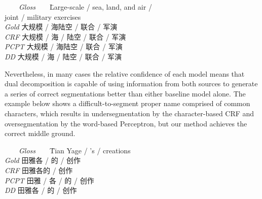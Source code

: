 \begin{small}
\begin{tabbing}
\ \ \ \ \= \emph{Gloss}\ \ \ \ \= Large-scale / sea, land, and air / \\ 
\> \> joint / military exercises\\
\> \emph{Gold}\> 大规模 / 海陆空 / 联合 / 军演\\

\> \emph{CRF}\> 大规模 / 海 / 陆空 / 联合 / 军演\\

\> \emph{PCPT}\> 大规模 / 海陆空 / 联合 / 军演\\

\> \emph{DD}\> 大规模 / 海 / 陆空 / 联合 / 军演\\
\end{tabbing}
\end{small}
Nevertheless, in many cases the relative confidence of each model means that dual decomposition is capable of using information from both sources to generate a series of correct segmentations better than either baseline model alone. The example below shows a difficult-to-segment proper name comprised of common characters, which results in undersegmentation by the character-based CRF and oversegmentation by the word-based Perceptron, but our method achieves the correct middle ground.

\begin{small}
\begin{tabbing}
\ \ \ \ \= \emph{Gloss}\ \ \ \ \= Tian Yage / 's / creations \\
\> \emph{Gold} \>   田雅各 / 的 / 创作 \\
\> \emph{CRF} \>  田雅各的 / 创作 \\
\> \emph{PCPT} \>  田雅 / 各 / 的 / 创作 \\
\> \emph{DD} \>  田雅各 / 的 / 创作 \\
\end{tabbing}
\end{small}


